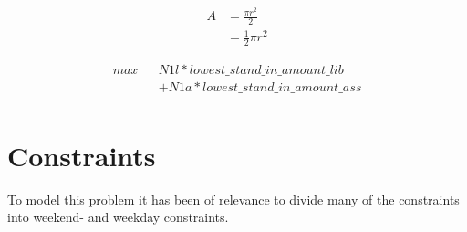 \begin{equation}
\begin{split}
A & = \frac{\pi r^2}{2} \\
 & = \frac{1}{2} \pi r^2
\end{split}
\end{equation}

\begin{equation*}
\begin{aligned}
max && N1l*lowest\_stand\_in\_amount\_lib \\
&& + N1a*lowest\_stand\_in\_amount\_ass \\
\end{aligned}
\end{equation*}

\section{Constraints}
To model this problem it has been of relevance to divide many of the constraints into weekend- and weekday constraints. 